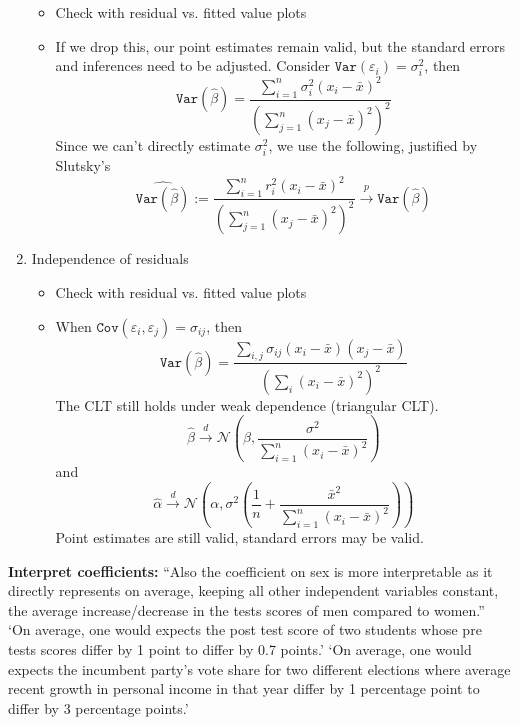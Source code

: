 \documentclass{article}
\begin{document}
\begin{enumerate}
\begin{itemize}
      \item Check with residual vs. fitted value plots
      \item If we drop this, our point estimates remain valid, but the standard errors and inferences need to be adjusted.
        Consider $\mathtt{Var}(\varepsilon_i) = \sigma^2_i$, then
        \[ \mathtt{Var}(\hat{\beta}) = \frac{\sum_{i=1}^{n}\sigma^2_i (x_i - \bar{x})^2}{(\sum_{j=1}^{n}(x_j - \bar{x})^2)^2} \]
        Since we can't directly estimate $\sigma^2_i$, we use the following, justified by Slutsky's
        \[  \widehat{\mathtt{Var}(\hat{\beta})} := \frac{\sum_{i=1}^{n} r_i^2 (x_i - \bar{x})^2 }{(\sum_{j=1}^{n}(x_j - \bar{x})^2)^2} \xrightarrow{p} \mathtt{Var}(\hat{\beta})\]
    \end{itemize}
  \item Independence of residuals
    \begin{itemize}
      \item Check with residual vs. fitted value plots
      \item When $\mathtt{Cov}(\varepsilon_i, \varepsilon_j) = \sigma_{ij}$, then
        \[ \mathtt{Var}(\hat{\beta}) = \frac{\sum_{i, j}\sigma_{ij}(x_i - \bar{x})(x_j - \bar{x})}{(\sum_i (x_i - \bar{x})^2)^2}\]
        The CLT still holds under weak dependence (triangular CLT).
        \[\hat{\beta} \xrightarrow{d} \mathcal{N}\left(\beta, \frac{\sigma^2}{\sum_{i=1}^{n}(x_i - \bar{x})^2}\right) \]
        and
        \[\hat{\alpha} \xrightarrow{d} \mathcal{N}\left(\alpha, \sigma^2 \left(\frac{1}{n} + \frac{\bar{x}^2}{\sum_{i=1}^{n}(x_i - \bar{x})^2} \right) \right) \]
        Point estimates are still valid, standard errors may be valid.
    \end{itemize}
\end{enumerate}

\textbf{Interpret coefficients:} ``Also the coefficient on sex is more interpretable as it directly represents on average, keeping  all other independent variables constant, the average increase/decrease in the tests scores of men compared to women.''
`On average, one would expects the post test score of two students whose pre tests scores differ by 1 point to differ by 0.7 points.'
`On average, one would expects the incumbent party’s vote share for two different elections where average recent growth in personal income in that year differ by 1 percentage point to differ by 3 percentage points.'
\end{document}
